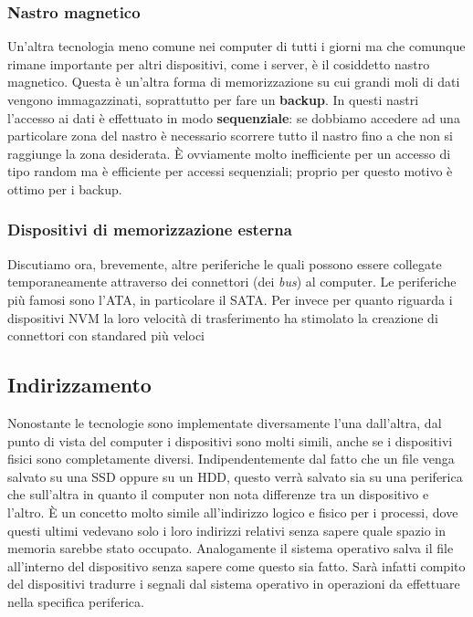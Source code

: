 \subsubsection{Nastro magnetico}
Un'altra tecnologia meno comune nei computer di tutti i giorni ma che comunque rimane importante per altri dispositivi, come i server, è il cosiddetto  nastro magnetico. Questa è un'altra forma di memorizzazione su cui grandi moli di dati vengono immagazzinati, soprattutto per fare un \textbf{backup}. In questi nastri l'accesso ai dati è effettuato in modo \textbf{sequenziale}: se dobbiamo accedere ad una particolare zona del nastro è necessario scorrere tutto il nastro fino a che non si raggiunge la zona desiderata. È ovviamente molto inefficiente per un accesso di tipo random ma è efficiente per accessi sequenziali; proprio per questo motivo è ottimo per i backup. 

% 
\subsubsection{Dispositivi di memorizzazione esterna}
Discutiamo ora, brevemente, altre periferiche le quali possono essere collegate temporaneamente attraverso dei connettori (dei \textit{bus}) al computer. Le periferiche più famosi sono l'ATA, in particolare il SATA. Per invece per quanto riguarda i dispositivi NVM la loro velocità di trasferimento ha stimolato la creazione di connettori con standared più veloci 

% 
\subsection{Indirizzamento}
Nonostante le tecnologie sono implementate diversamente l'una dall'altra, dal punto di vista del computer i dispositivi sono molti simili, anche se i dispositivi fisici sono completamente diversi. Indipendentemente dal fatto che un file venga salvato su una SSD oppure su un HDD, questo verrà salvato sia su una periferica che sull'altra in quanto il computer non nota differenze tra un dispositivo e l'altro. È un concetto molto simile all'indirizzo logico e fisico per i processi, dove questi ultimi vedevano solo i loro indirizzi relativi senza sapere quale spazio in memoria sarebbe stato occupato. Analogamente il sistema operativo salva il file all'interno del dispositivo senza sapere come questo sia fatto. Sarà infatti compito del dispositivi tradurre i segnali dal sistema operativo in operazioni da effettuare nella specifica periferica.

